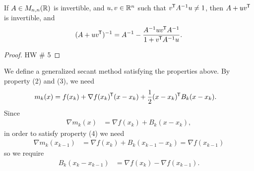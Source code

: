 \begin{lemma}
    If $A \in M_{n,n}(\mathbb{R})$ is invertible, and $u, v \in \mathbb{R}^n$ such that $v^{\mkern-1.5mu\mathsf{T}}A^{-1}u \neq 1$, then $A + uv^{\mkern-1.5mu\mathsf{T}}$ is invertible, and
    \begin{align*}
        (A + uv^{\mkern-1.5mu\mathsf{T}})^{-1} = A^{-1} - \frac{A^{-1}uv^{\mkern-1.5mu\mathsf{T}}A^{-1}}{1 + v^{\mkern-1.5mu\mathsf{T}}A^{-1}u}.
    \end{align*}
\end{lemma}

\begin{proof}
    {\color{red}\Large HW \# 5}
\end{proof}

\begin{defn}
    We define a generalized secant method satisfying the properties above. By property (2) and (3), we need
    \begin{align*}
        m_k(x) &= f(x_k) + \nabla f(x_k)^{\mkern-1.5mu\mathsf{T}}(x-x_k) + \frac{1}{2}(x-x_k)^{\mkern-1.5mu\mathsf{T}}B_k(x-x_k).
    \end{align*}
    Since
    \begin{align*}
        \nabla m_k(x) &= \nabla f(x_k) + B_k(x-x_k),
    \end{align*}
    in order to satisfy property (4) we need
    \begin{align*}
        \nabla m_k(x_{k-1}) &= \nabla f(x_k) + B_k(x_{k-1}-x_k) = \nabla f(x_{k-1})
    \end{align*}
    so we require
    \begin{align*}
        B_k(x_{k}-x_{k-1}) &= \nabla f(x_k) - \nabla f(x_{k-1}).
    \end{align*}
\end{defn}


